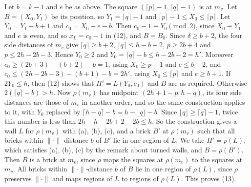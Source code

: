 {Let $b = k - 1$ and $e$ be as above. The square $(\lceil p \rceil - 1, \lceil q \rceil - 1)$ is at $m_v$. Let $B = (X_0, Y_1)$ be its position, so $Y_1 = \lceil q \rceil - 1$ and $\lceil p \rceil - 1 \le X_0 \le \lceil p \rceil$. Let $Y_0 = Y_1 - b + 1$ and $c_0 = X_0 - e - b$. Then $c_0 - 1 \equiv Y_0 \pmod 2$, since $X_0 \equiv Y_1$ and $e$ is even, and so $x_L = c_0 - 1$ in (12), and $B = B_0$. Since $\delta \ge b + 2$, the four side distances of $m_v$ give $\lceil q \rceil \ge b + 2$, $\lceil q \rceil \le h - b - 2$, $p \ge 2b + 4$ and $p \le 2h - 2b - 3$. Hence $Y_0 \ge 2$ and $Y_0 = \lceil q \rceil - b \le h - 2b - 2 = h'$. Moreover $c_0 \ge (2b + 3) - (b + 2) - b = 1$, using $X_0 \ge p - 1$ and $e \le b + 2$, and $c_0 \le (2h - 2b - 3) - (b + 1) - b = 2h'$, using $X_0 \le \lceil p \rceil$ and $e \ge b + 1$. If $2Y_0 \le h$, then (12) shows that $H' = L(Y_0, c_0)$ and $B$ are as required. Otherwise $2(\lceil q \rceil - b) > h$. Now $\rho(m_v)$ has midpoint $(2h + 1 - p, h - q)$, its four side distances are those of $m_v$ in another order, and so the same construction applies to it, with $Y_0$ replaced by $\lceil h - q \rceil - b = h - \lfloor q \rfloor - b$. Since $\lfloor q \rfloor \ge \lceil q \rceil - 1$, twice this number is less than $2h - h - 2b + 2 - 2b \le h$. So the construction gives a wall $L$ for $\rho(m_v)$ with (a), (b), (c), and a brick $B'$ at $\rho(m_v)$ such that all bricks within $\|\cdot\|$-distance $b$ of $B'$ lie in one region of $L$. We take $H' = \rho(L)$, which satisfies (a), (b), (c) by the remark about turned walls, and $B = \rho(B')$. Then $B$ is a brick at $m_v$, since $\rho$ maps the squares at $\rho(m_v)$ to the squares at $m_v$. All bricks within $\|\cdot\|$-distance $b$ of $B$ lie in one region of $\rho(L)$, since $\rho$ preserves $\|\cdot\|$ and maps regions of $L$ to regions of $\rho(L)$. This proves (13).

}
